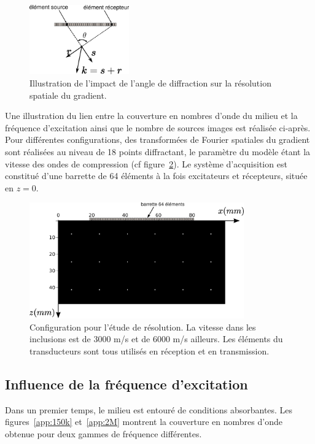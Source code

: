 \begin{figure}[!h]
	\centering
	\includegraphics[height=3cm]{img/reso.png}
	\caption{Illustration de l'impact de l'angle de diffraction sur la résolution spatiale du gradient.\label{app:k1}}
\end{figure}


Une illustration du lien entre la couverture en nombres d'onde du milieu et la fréquence d'excitation ainsi que le nombre de sources images est réalisée ci-après. Pour différentes configurations, des transformées de Fourier spatiales du gradient sont réalisées au niveau de 18 points diffractant, le paramètre du modèle étant la vitesse des ondes de compression (cf figure~\ref{app:config_reso}). Le système d'acquisition est constitué d'une barrette de 64 éléments à la fois excitateurs et récepteurs, située en $z=0$. 

\begin{figure}[!h]
	\centering
	\includegraphics[height=5cm]{img/vp_scat.png}
	\caption{Configuration pour l'étude de résolution. La vitesse dans les inclusions est de 3000 m/s et de 6000 m/s ailleurs. Les éléments du transducteurs sont tous utilisés en réception et en transmission. \label{app:config_reso}}
\end{figure}


\subsection{Influence de la fréquence d'excitation}

Dans un premier temps, le milieu est entouré de conditions absorbantes. Les figures~\ref{app:150k} et~\ref{app:2M} montrent la couverture en nombres d'onde obtenue pour deux gammes de fréquence différentes. 
    
